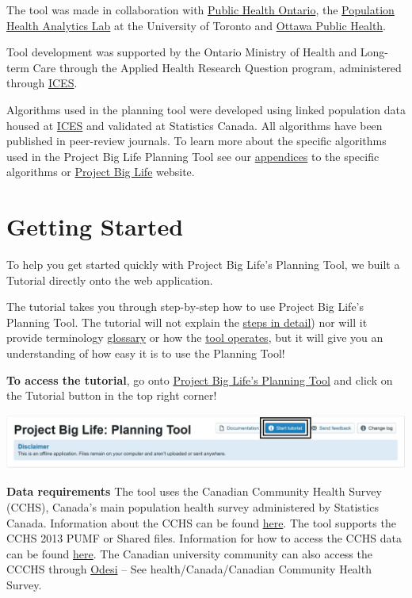 \documentclass[]{book}
\begin{document}
The tool was made in collaboration with \href{https://www.publichealthontario.ca/}{Public Health Ontario}, the \href{https://pophealthanalytics.com/}{Population Health Analytics Lab} at the University of Toronto and \href{http://www.ottawapublichealth.ca/en/index.aspx}{Ottawa Public Health}.

Tool development was supported by the Ontario Ministry of Health and Long-term Care through the Applied Health Research Question program, administered through \href{https://www.ICES.on.ca}{ICES}.

Algorithms used in the planning tool were developed using linked population data housed at \href{https://www.ices.on.ca/}{ICES} and validated at Statistics Canada. All algorithms have been published in peer-review journals. To learn more about the specific algorithms used in the Project Big Life Planning Tool see our \protect\hyperlink{mport}{appendices} to the specific algorithms or \href{https://www.projectbiglife.ca/science}{Project Big Life} website.

\hypertarget{getting-started}{%
\chapter{Getting Started}\label{getting-started}}

To help you get started quickly with Project Big Life's Planning Tool, we built a Tutorial directly onto the web application.

The tutorial takes you through step-by-step how to use Project Big Life's Planning Tool. The tutorial will not explain the \protect\hyperlink{howto}{steps in detail}) nor will it provide terminology \protect\hyperlink{glossary}{glossary} or how the \protect\hyperlink{mport}{tool operates}, but it will give you an understanding of how easy it is to use the Planning Tool!

\textbf{To access the tutorial}, go onto \href{http://planning.projectbiglife.ca/}{Project Big Life's Planning Tool} and click on the Tutorial button in the top right corner!

\begin{center}\includegraphics{Images/Tutorial Button} \end{center}

\textbf{Data requirements}
The tool uses the Canadian Community Health Survey (CCHS), Canada's main population health survey administered by Statistics Canada. Information about the CCHS can be found \href{http://www23.statcan.gc.ca/imdb/p2SV.pl?Function=getSurvey\&SDDS=3226}{here}. The tool supports the CCHS 2013 PUMF or Shared files. Information for how to access the CCHS data can be found \href{https://www150.statcan.gc.ca/n1/pub/82-620-m/2005001/4144189-eng.htm}{here}. The Canadian university community can also access the CCCHS through \href{http://odesi2.scholarsportal.info/webview/}{Odesi} -- See health/Canada/Canadian Community Health Survey.
\end{document}
